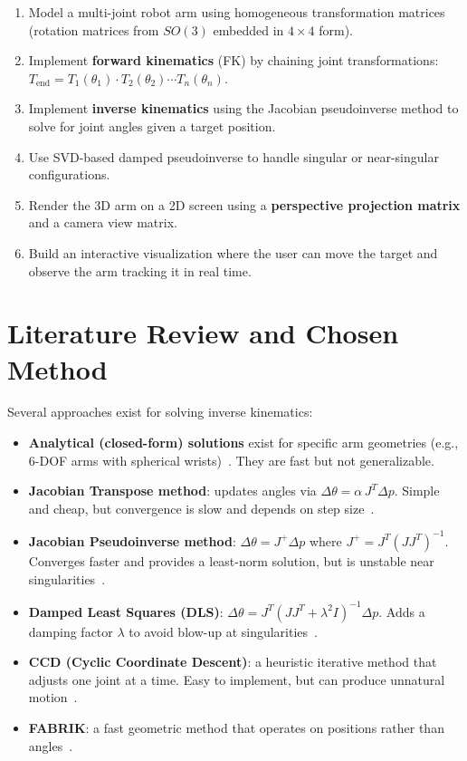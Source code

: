 \documentclass[11pt]{article}
\begin{document}
\begin{enumerate}[nosep]
    \item Model a multi-joint robot arm using homogeneous transformation matrices (rotation matrices from $SO(3)$ embedded in $4 \times 4$ form).
    \item Implement \textbf{forward kinematics} (FK) by chaining joint transformations: $T_{\text{end}} = T_1(\theta_1) \cdot T_2(\theta_2) \cdots T_n(\theta_n)$.
    \item Implement \textbf{inverse kinematics} using the Jacobian pseudoinverse method to solve for joint angles given a target position.
    \item Use SVD-based damped pseudoinverse to handle singular or near-singular configurations.
    \item Render the 3D arm on a 2D screen using a \textbf{perspective projection matrix} and a camera view matrix.
    \item Build an interactive visualization where the user can move the target and observe the arm tracking it in real time.
\end{enumerate}

\section{Literature Review and Chosen Method}

Several approaches exist for solving inverse kinematics:

\begin{itemize}[nosep]
    \item \textbf{Analytical (closed-form) solutions} exist for specific arm geometries (e.g., 6-DOF arms with spherical wrists)~\cite{roboticworx}. They are fast but not generalizable.
    \item \textbf{Jacobian Transpose method}: updates angles via $\Delta\theta = \alpha \, J^T \Delta p$. Simple and cheap, but convergence is slow and depends on step size~\cite{buss2004}.
    \item \textbf{Jacobian Pseudoinverse method}: $\Delta\theta = J^+ \Delta p$ where $J^+ = J^T(JJ^T)^{-1}$. Converges faster and provides a least-norm solution, but is unstable near singularities~\cite{buss2004}.
    \item \textbf{Damped Least Squares (DLS)}: $\Delta\theta = J^T(JJ^T + \lambda^2 I)^{-1}\Delta p$. Adds a damping factor $\lambda$ to avoid blow-up at singularities~\cite{buss2004}.
    \item \textbf{CCD (Cyclic Coordinate Descent)}: a heuristic iterative method that adjusts one joint at a time. Easy to implement, but can produce unnatural motion~\cite{buss2004}.
    \item \textbf{FABRIK}: a fast geometric method that operates on positions rather than angles~\cite{buss2004}.
\end{itemize}
\end{document}
